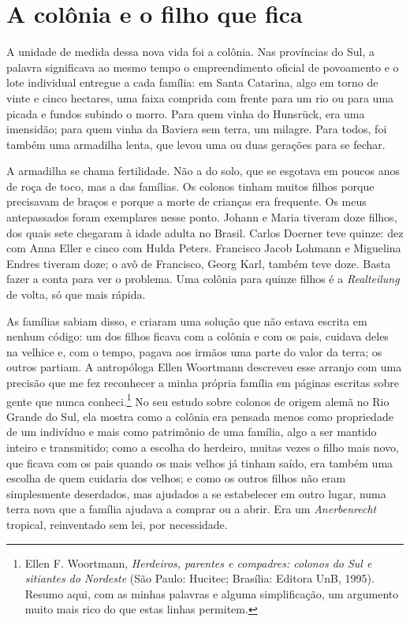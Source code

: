 \documentclass[
  brazilian,
  11pt,
  openany]{book}
\begin{document}
\section{A colônia e o filho que
fica}\label{a-coluxf4nia-e-o-filho-que-fica}

A unidade de medida dessa nova vida foi a colônia. Nas províncias do
Sul, a palavra significava ao mesmo tempo o empreendimento oficial de
povoamento e o lote individual entregue a cada família: em Santa
Catarina, algo em torno de vinte e cinco hectares, uma faixa comprida
com frente para um rio ou para uma picada e fundos subindo o morro. Para
quem vinha do Hunsrück, era uma imensidão; para quem vinha da Baviera
sem terra, um milagre. Para todos, foi também uma armadilha lenta, que
levou uma ou duas gerações para se fechar.

A armadilha se chama fertilidade. Não a do solo, que se esgotava em
poucos anos de roça de toco, mas a das famílias. Os colonos tinham
muitos filhos porque precisavam de braços e porque a morte de crianças
era frequente. Os meus antepassados foram exemplares nesse ponto. Johann
e Maria tiveram doze filhos, dos quais sete chegaram à idade adulta no
Brasil. Carlos Doerner teve quinze: dez com Anna Eller e cinco com Hulda
Peters. Francisco Jacob Lohmann e Miguelina Endres tiveram doze; o avô
de Francisco, Georg Karl, também teve doze. Basta fazer a conta para ver
o problema. Uma colônia para quinze filhos é a \emph{Realteilung} de
volta, só que mais rápida.

As famílias sabiam disso, e criaram uma solução que não estava escrita
em nenhum código: um dos filhos ficava com a colônia e com os pais,
cuidava deles na velhice e, com o tempo, pagava aos irmãos uma parte do
valor da terra; os outros partiam. A antropóloga Ellen Woortmann
descreveu esse arranjo com uma precisão que me fez reconhecer a minha
própria família em páginas escritas sobre gente que nunca
conheci.\footnote{Ellen F. Woortmann, \emph{Herdeiros, parentes e
  compadres: colonos do Sul e sitiantes do Nordeste} (São Paulo:
  Hucitec; Brasília: Editora UnB, 1995). Resumo aqui, com as minhas
  palavras e alguma simplificação, um argumento muito mais rico do que
  estas linhas permitem.} No seu estudo sobre colonos de origem alemã no
Rio Grande do Sul, ela mostra como a colônia era pensada menos como
propriedade de um indivíduo e mais como patrimônio de uma família, algo
a ser mantido inteiro e transmitido; como a escolha do herdeiro, muitas
vezes o filho mais novo, que ficava com os pais quando os mais velhos já
tinham saído, era também uma escolha de quem cuidaria dos velhos; e como
os outros filhos não eram simplesmente deserdados, mas ajudados a se
estabelecer em outro lugar, numa terra nova que a família ajudava a
comprar ou a abrir. Era um \emph{Anerbenrecht} tropical, reinventado sem
lei, por necessidade.
\end{document}
